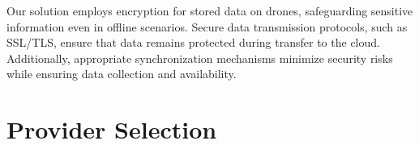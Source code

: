\documentclass{article}
\begin{document}
\begin{enumerate}
    Our solution employs encryption for stored data on drones, safeguarding sensitive information even in offline scenarios. Secure data transmission protocols, such as SSL/TLS, ensure that data remains protected during transfer to the cloud. Additionally, appropriate synchronization mechanisms minimize security risks while ensuring data collection and availability.



\end{enumerate}

\newpage
\section{Provider Selection}
\end{document}
